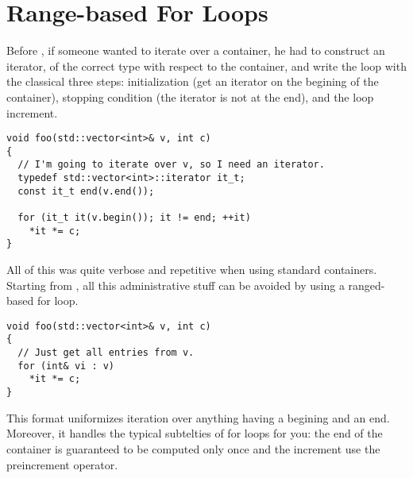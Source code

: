 \section{Range-based For Loops}
\label{range-based-for-loops}

Before , if someone wanted to iterate over a container, he had
to construct an iterator, of the correct type with respect to the
container, and write the loop with the classical three steps:
initialization (get an iterator on the begining of the container),
stopping condition (the iterator is not at the end), and the loop
increment.

\begin{lstlisting}
void foo(std::vector<int>& v, int c)
{
  // I'm going to iterate over v, so I need an iterator.
  typedef std::vector<int>::iterator it_t;
  const it_t end(v.end());

  for (it_t it(v.begin()); it != end; ++it)
    *it *= c;
}
\end{lstlisting}

All of this was quite verbose and repetitive when using standard
containers. Starting from , all this administrative stuff can be
avoided by using a ranged-based for loop.

\begin{lstlisting}
void foo(std::vector<int>& v, int c)
{
  // Just get all entries from v.
  for (int& vi : v)
    *it *= c;
}
\end{lstlisting}

This format uniformizes iteration over anything having a begining and
an end. Moreover, it handles the typical subtelties of for loops for
you: the end of the container is guaranteed to be computed only once
and the increment use the preincrement operator.
